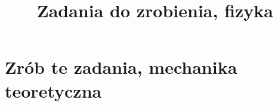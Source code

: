 \documentclass[a4paper,11pt]{article}
\title{Zadania do zrobienia, fizyka}
\begin{document}





\maketitle  %





\section{Zrób te zadania, mechanika teoretyczna}


\end{document}
